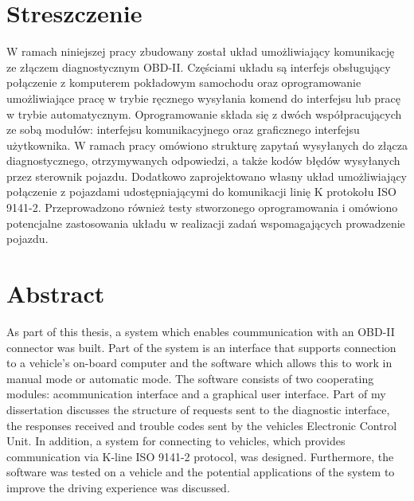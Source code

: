 \documentclass[12pt, twoside]{article} %
\numberwithin{equation}{subsection}
\numberwithin{figure}{section}
\numberwithin{table}{section}
\begin{document}
\section*{Streszczenie}
\vspace{0.5cm}
\hspace{0.5cm}W ramach niniejszej pracy zbudowany został układ umożliwiający komunikację ze złączem diagnostycznym OBD-II. Częściami układu są interfejs obsługujący połączenie z komputerem pokładowym samochodu oraz oprogramowanie umożliwiające pracę w trybie ręcznego wysyłania komend do interfejsu lub pracę w trybie automatycznym. Oprogramowanie składa się z dwóch współpracujących ze sobą modułów: interfejsu komunikacyjnego oraz graficznego interfejsu użytkownika. W ramach pracy omówiono strukturę zapytań wysyłanych do złącza diagnostycznego, otrzymywanych odpowiedzi, a także kodów błędów wysyłanych przez sterownik pojazdu. Dodatkowo zaprojektowano własny układ umożliwiający połączenie z pojazdami udostępniającymi do komunikacji linię K protokołu ISO 9141-2. Przeprowadzono również testy stworzonego oprogramowania i omówiono potencjalne zastosowania układu w realizacji zadań wspomagających prowadzenie pojazdu.
\newpage

\section*{Abstract}
\vspace{0.5cm}
\hspace{0.5cm}As part of this thesis, a system which enables coummunication with an OBD-II connector was built. Part of the system is an interface that supports connection to a vehicle's on-board computer and the software which allows this to work in manual mode or automatic mode. The software consists of two cooperating modules: acommunication interface and a graphical user interface. Part of my dissertation discusses the structure of requests sent to the diagnostic interface, the responses received and trouble codes sent by the vehicles Electronic Control Unit. In addition, a system for connecting to vehicles, which provides communication via K-line ISO 9141-2 protocol, was designed. Furthermore, the software was tested on a vehicle and the potential applications of the system to improve the driving experience was discussed.


\thispagestyle{empty}
\vspace{0.5cm}
\hspace{0.5cm}

\newpage
\end{document}
